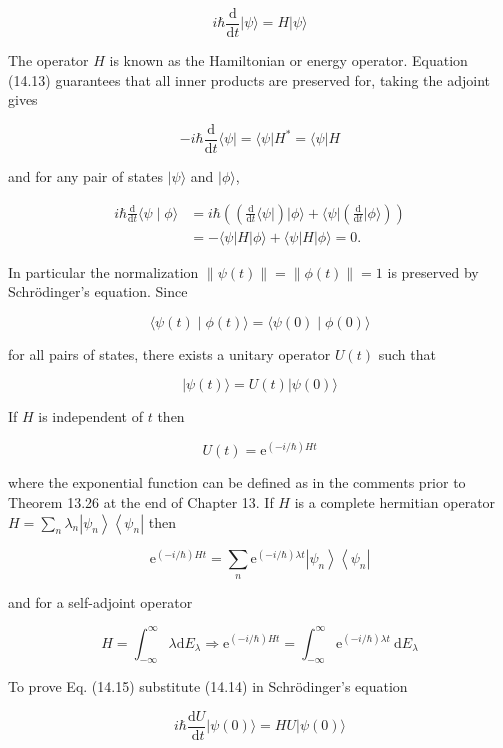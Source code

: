 \documentclass[10pt]{article}
\begin{document}
$$
i \hbar \frac{\mathrm{d}}{\mathrm{d} t}|\psi\rangle=H|\psi\rangle
$$

The operator $H$ is known as the Hamiltonian or energy operator. Equation (14.13) guarantees that all inner products are preserved for, taking the adjoint gives

$$
-i \hbar \frac{\mathrm{d}}{\mathrm{d} t}\langle\psi|=\langle\psi| H^{*}=\langle\psi| H
$$

and for any pair of states $|\psi\rangle$ and $|\phi\rangle$,

$$
\begin{aligned}
i \hbar \frac{\mathrm{d}}{\mathrm{d} t}\langle\psi \mid \phi\rangle & =i \hbar\left(\left(\frac{\mathrm{d}}{\mathrm{d} t}\langle\psi|\right)|\phi\rangle+\langle\psi|\left(\frac{\mathrm{d}}{\mathrm{d} t}|\phi\rangle\right)\right) \\
& =-\langle\psi|H| \phi\rangle+\langle\psi|H| \phi\rangle=0 .
\end{aligned}
$$

In particular the normalization $\|\psi(t)\|=\|\phi(t)\|=1$ is preserved by Schrödinger's equation. Since

$$
\langle\psi(t) \mid \phi(t)\rangle=\langle\psi(0) \mid \phi(0)\rangle
$$

for all pairs of states, there exists a unitary operator $U(t)$ such that

$$
|\psi(t)\rangle=U(t)|\psi(0)\rangle
$$

If $H$ is independent of $t$ then

$$
U(t)=\mathrm{e}^{(-i / \hbar) H t}
$$

where the exponential function can be defined as in the comments prior to Theorem 13.26 at the end of Chapter 13. If $H$ is a complete hermitian operator $H=\sum_{n} \lambda_{n}\left|\psi_{n}\right\rangle\left\langle\psi_{n}\right|$ then

$$
\mathrm{e}^{(-i / \hbar) H t}=\sum_{n} \mathrm{e}^{(-i / \hbar) \lambda t}\left|\psi_{n}\right\rangle\left\langle\psi_{n}\right|
$$

and for a self-adjoint operator

$$
H=\int_{-\infty}^{\infty} \lambda \mathrm{d} E_{\lambda} \Longrightarrow \mathrm{e}^{(-i / \hbar) H t}=\int_{-\infty}^{\infty} \mathrm{e}^{(-i / \hbar) \lambda t} \mathrm{~d} E_{\lambda}
$$

To prove Eq. (14.15) substitute (14.14) in Schrödinger's equation

$$
i \hbar \frac{\mathrm{d} U}{\mathrm{~d} t}|\psi(0)\rangle=H U|\psi(0)\rangle
$$
\end{document}
